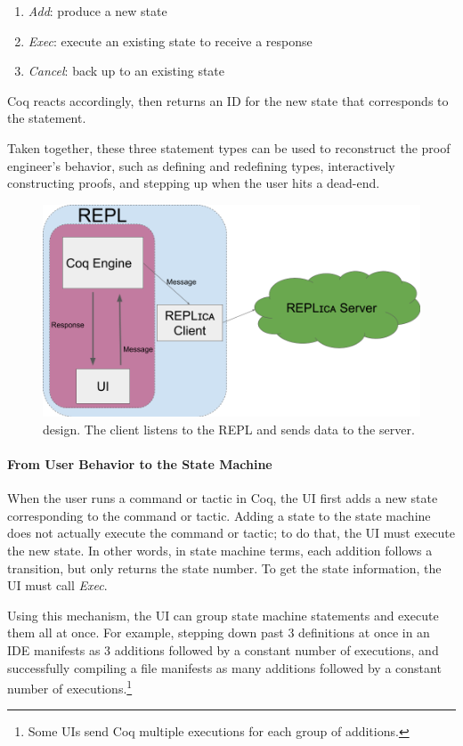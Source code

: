 \begin{enumerate}
\item \textit{Add}: produce a new state
\item \textit{Exec}: execute an existing state to receive a response
\item \textit{Cancel}: back up to an existing state
\end{enumerate}
Coq reacts accordingly, then returns an ID for the new state
that corresponds to the statement.

Taken together, these three statement types can be used
to reconstruct the proof engineer's behavior,
such as defining and redefining types, interactively constructing proofs,
and stepping up when the user hits a dead-end.

\begin{figure}
  \includegraphics[width=0.8\columnwidth]{maintenance/fig/architecture.png}
\caption{\toolname design. The \toolname client listens to the REPL
and sends data to the \toolname server.}
\label{fig:design}
\end{figure}

\paragraph{From User Behavior to the State Machine}
When the user runs a command or tactic in Coq, the UI first adds
a new state corresponding to the command or tactic.
Adding a state to the state machine does not actually execute the
command or tactic;
to do that, the UI must execute the new state.
In other words, in state machine terms, each addition follows a transition,
but only returns the state number.
To get the state information, the UI must call \textit{Exec}.

Using this mechanism, the UI can group state machine statements and execute them
all at once. %
For example, stepping down past 3 definitions at once in an IDE
manifests as 3 additions followed by a constant
number of executions, and successfully compiling a file manifests as 
many additions followed by a constant number of 
executions.\footnote{Some UIs send Coq multiple executions for each
group of additions.} 

